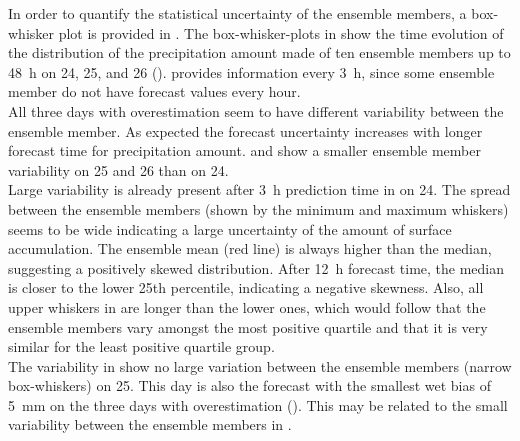 \noindent
In order to quantify the statistical uncertainty of the ensemble members, a box-whisker plot is provided in . The box-whisker-plots in  show the time evolution of the distribution of the precipitation amount made of ten ensemble members up to \SI{48}{\hour} on \num{24}, \num{25}, and \SI{26}{\dec} (). 
 provides information every \SI{3}{\hour}, since some ensemble member do not have forecast values every hour.
\\
All three days with overestimation seem to have different variability between the ensemble member. As expected the forecast uncertainty increases  with longer forecast time for precipitation amount.  and  show a smaller ensemble member variability on \num{25} and \SI{26}{\dec} than on \SI{24}{\dec}.
\\
Large variability is already present after \SI{3}{\hour} prediction time in  on \SI{24}{\dec}. The spread between the ensemble members (shown by the minimum and maximum whiskers) seems to be wide indicating a large uncertainty of the amount of surface accumulation. The ensemble mean (red line) is always higher than the median, suggesting a positively skewed distribution. After \SI{12}{\hour} forecast time, the median is closer to the lower 25th percentile, indicating a negative skewness. Also, all upper whiskers in  are longer than the lower ones, which would follow that the ensemble members vary amongst the most positive quartile and that it is very similar for the least positive quartile group. 
\\
The variability in  show no large variation between the ensemble members (narrow box-whiskers) on \SI{25}{\dec}. This day is also the forecast with the smallest wet bias of \SI{5}{\mm} on the three days with overestimation (). This may be related to the small variability between the ensemble members in . 
